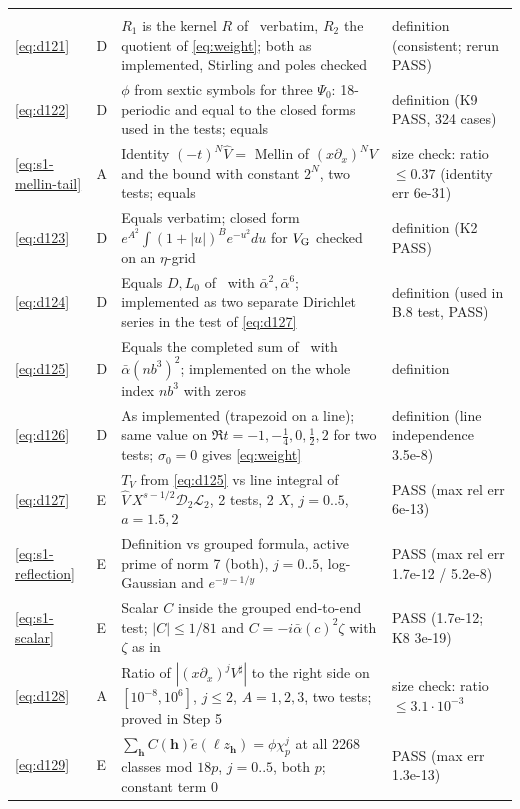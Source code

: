 \documentclass[11pt]{article}
\numberwithin{equation}{section}
\newcommand{\ce}{\check e}
\begin{document}
\begin{longtable}{@{}>{\raggedright\arraybackslash}p{1.2cm}>{\centering\arraybackslash}p{0.7cm}>{\raggedright\arraybackslash}p{9.05cm}>{\raggedright\arraybackslash}p{4.3cm}@{}}
\multicolumn{4}{@{}l}{\emph{Appendix~B}}\\
\eqref{eq:d121} & D & $R_1$ is the kernel $R$ of~\cite{OAI78} verbatim, $R_2$ the quotient of \eqref{eq:weight}; both as implemented, Stirling and poles checked & definition (consistent; rerun PASS)\\
\eqref{eq:d122} & D & $\phi$ from sextic symbols for three $\Psi_0$: 18-periodic and equal to the closed forms used in the tests; equals \cite{OAI78} & definition (K9 PASS, 324 cases)\\
\eqref{eq:s1-mellin-tail} & A & Identity $(-t)^N\widehat V=$ Mellin of $(x\partial_x)^NV$ and the bound with constant $2^N$, two tests; equals \cite[eq.~(4.11)]{OAI78} & size check: ratio $\le0.37$ (identity err 6e-31)\\
\eqref{eq:d123} & D & Equals \cite{OAI78} verbatim; closed form $e^{A^2}\int(1+|u|)^Be^{-u^2}du$ for $V_{\rm G}$ checked on an $\eta$-grid & definition (K2 PASS)\\
\eqref{eq:d124} & D & Equals $D,L_0$ of~\cite{OAI78} with $\bar\alpha^2,\bar\alpha^6$; implemented as two separate Dirichlet series in the test of \eqref{eq:d127} & definition (used in B.8 test, PASS)\\
\eqref{eq:d125} & D & Equals the completed sum of~\cite{OAI78} with $\bar\alpha(nb^3)^2$; implemented on the whole index $nb^3$ with zeros & definition\\
\eqref{eq:d126} & D & As implemented (trapezoid on a line); same value on $\Re t=-1,-\frac14,0,\frac12,2$ for two tests; $\sigma_0=0$ gives \eqref{eq:weight} & definition (line independence 3.5e-8)\\
\eqref{eq:d127} & E & $T_V$ from \eqref{eq:d125} vs line integral of $\widehat V\,X^{s-1/2}\mathcal D_2\mathcal L_2$, 2 tests, 2 $X$, $j=0..5$, $a=1.5,2$ & PASS (max rel err 6e-13)\\
\eqref{eq:s1-reflection} & E & Definition vs grouped formula, active prime of norm 7 (both), $j=0..5$, log-Gaussian and $e^{-y-1/y}$ & PASS (max rel err 1.7e-12 / 5.2e-8)\\
\eqref{eq:s1-scalar} & E & Scalar $C$ inside the grouped end-to-end test; $|C|\le1/81$ and $C=-i\bar\alpha(c)^2\zeta$ with $\zeta$ as in~\cite{OAI78} & PASS (1.7e-12; K8 3e-19)\\
\eqref{eq:d128} & A & Ratio of $|(x\partial_x)^jV^\sharp|$ to the right side on $[10^{-8},10^6]$, $j\le2$, $A=1,2,3$, two tests; proved in Step 5 & size check: ratio $\le3.1\cdot10^{-3}$\\
\eqref{eq:d129} & E & $\sum_{\mathbf h}C(\mathbf h)\ce(\ell z_{\mathbf h})=\phi\chi_p^j$ at all 2268 classes mod $18p$, $j=0..5$, both $p$; constant term 0 & PASS (max err 1.3e-13)\\

\end{longtable}
\end{document}
